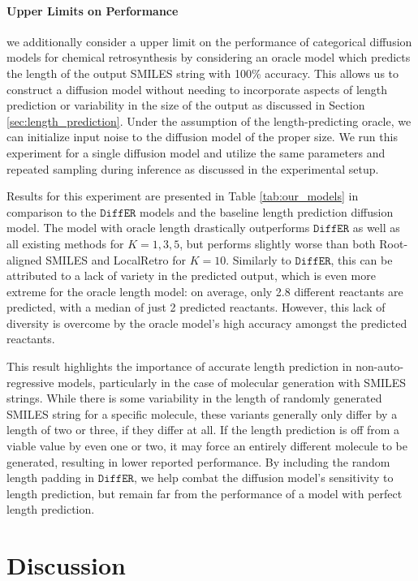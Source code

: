 \documentclass{article}
\newcommand{\ours}{$\texttt{DiffER}$\xspace}
\begin{document}
\paragraph{Upper Limits on Performance}
we additionally consider a upper limit on the performance of categorical diffusion models for chemical retrosynthesis by considering an oracle model which predicts the length of the output SMILES string with 100\% accuracy. This allows us to construct a diffusion model without needing to incorporate aspects of length prediction or variability in the size of the output as discussed in Section \ref{sec:length_prediction}. Under the assumption of the length-predicting oracle, we can initialize input noise to the diffusion model of the proper size. We run this experiment for a single diffusion model and utilize the same parameters and repeated sampling during inference as discussed in the experimental setup.

Results for this experiment are presented in Table \ref{tab:our_models} in comparison to the \ours models and the baseline length prediction diffusion model. The model with oracle length drastically outperforms \ours as well as all existing methods for $K=1,3,5$, but performs slightly worse than both Root-aligned SMILES and LocalRetro for $K=10$. Similarly to \ours, this can be attributed to a lack of variety in the predicted output, which is even more extreme for the oracle length model: on average, only 2.8 different reactants are predicted, with a median of just 2 predicted reactants. However, this lack of diversity is overcome by the oracle model's high accuracy amongst the predicted reactants.

This result highlights the importance of accurate length prediction in non-auto-regressive models, particularly in the case of molecular generation with SMILES strings. While there is some variability in the length of randomly generated SMILES string for a specific molecule, these variants generally only differ by a length of two or three, if they differ at all. If the length prediction is off from a viable value by even one or two, it may force an entirely different molecule to be generated, resulting in lower reported performance. By including the random length padding in \ours, we help combat the diffusion model's sensitivity to length prediction, but remain far from the performance of a model with perfect length prediction.

\section{Discussion}
\label{sec:discussion}
\end{document}

